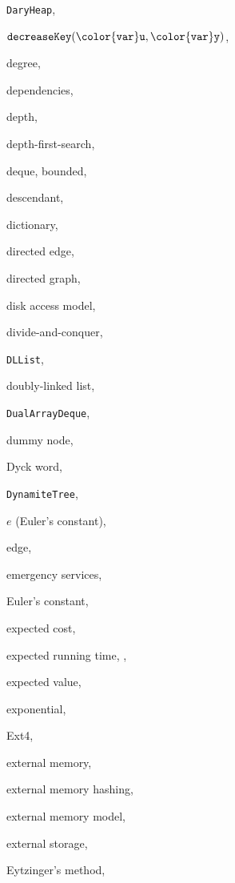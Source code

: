 \documentclass[10pt]{book}
\theoremstyle{plain}
\theoremstyle{definition}
\begin{document}
\begin{theindex}
  \indexspace

  \item \texttt{DaryHeap}, 
  \item \ensuremath{\mathtt{decreaseKey({\color{var}u},{\color{var}y})}}, 
  \item degree, 
  \item dependencies, 
  \item depth, 
  \item depth-first-search, 
  \item deque, 
    \subitem bounded, 
  \item descendant, 
  \item dictionary, 
  \item directed edge, 
  \item directed graph, 
  \item disk access model, 
  \item divide-and-conquer, 
  \item \texttt{DLList}, 
  \item doubly-linked list, 
  \item \texttt{DualArrayDeque}, 
  \item dummy node, 
  \item Dyck word, 
  \item \texttt{DynamiteTree}, 

  \indexspace

  \item $e$ (Euler's constant), 
  \item edge, 
  \item emergency services, 
  \item Euler's constant, 
  \item expected cost, 
  \item expected running time, , 
  \item expected value, 
  \item exponential, 
  \item Ext4, 
  \item external memory, 
  \item external memory hashing, 
  \item external memory model, 
  \item external storage, 
  \item Eytzinger's method, 


\end{theindex}
\end{document}
